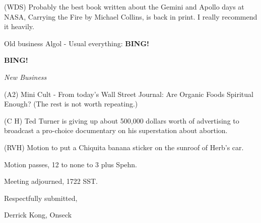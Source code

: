 \documentclass[12pt]{article}
\newcommand{\bing}{{\bf BING!} }
\newcommand{\goto}[1]{\bing \vskip 12pt \centerline{{\em{#1}}}}
\begin{document}
(WDS) Probably the best book written about the Gemini and Apollo days at NASA, Carrying the Fire by Michael Collins, is back in print. I really recommend it heavily.

Old business Algol - Usual everything: \bing

\goto{New Business}

(A2) Mini Cult - From today's Wall Street Journal: Are Organic Foods Spiritual Enough?  (The rest is not worth repeating.)

(C H) Ted Turner is giving up about 500,000 dollars worth of advertising to broadcast a pro-choice documentary on his superstation about abortion.

(RVH) Motion to put a Chiquita banana sticker on the sunroof of Herb's car.

Motion passes, 12 to none to 3 plus Spehn.

\vspace{12pt}

\noindent
Meeting adjourned, 1722 SST.

\vspace{18pt}

\centerline{Respectfully submitted,}
\centerline{Derrick Kong, Onseck}
\end{document}
